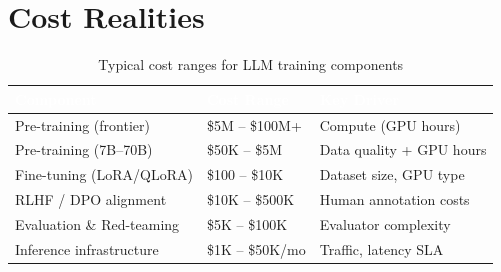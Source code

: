 \section{Cost Realities}

\begin{table}[H]
\centering\small\sffamily
{}
\begin{tabular}{L{3.8cm}L{2.8cm}L{3.5cm}}
\toprule
{}\textcolor{white}{\textbf{Component}} & \textcolor{white}{\textbf{Cost Range}} & \textcolor{white}{\textbf{Key Driver}} \\
\midrule
Pre-training (frontier) & \$5M -- \$100M+ & Compute (GPU hours) \\
Pre-training (7B--70B) & \$50K -- \$5M & Data quality + GPU hours \\
Fine-tuning (LoRA/QLoRA) & \$100 -- \$10K & Dataset size, GPU type \\
RLHF / DPO alignment & \$10K -- \$500K & Human annotation costs \\
Evaluation \& Red-teaming & \$5K -- \$100K & Evaluator complexity \\
Inference infrastructure & \$1K -- \$50K/mo & Traffic, latency SLA \\
\bottomrule
\end{tabular}
\caption{Typical cost ranges for LLM training components}
\end{table}
